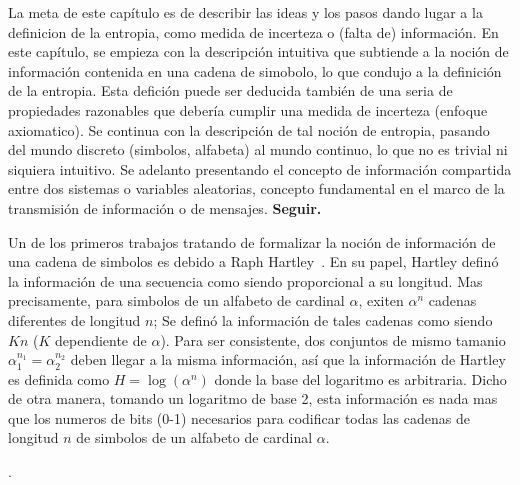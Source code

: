 {\color{red} La  meta de este cap\'itulo es  de describir las ideas  y los pasos
  dando lugar a la definicion de  la entropia, como medida de incerteza o (falta
  de)  informaci\'on.   En este  cap\'itulo,  se  empieza  con la  descripci\'on
  intuitiva que subtiende a la noci\'on de informaci\'on contenida en una cadena
  de simobolo, lo que condujo a  la definici\'on de la entropia. Esta defici\'on
  puede  ser deducida  tambi\'en  de  una seria  de  propiedades razonables  que
  deber\'ia cumplir  una medida de incerteza (enfoque  axiomatico).  Se continua
  con la descripci\'on  de tal noci\'on de entropia,  pasando del mundo discreto
  (simbolos,  alfabeta) al  mundo continuo,  lo que  no es  trivial  ni siquiera
  intuitivo.  Se  adelanto presentando  el concepto de  informaci\'on compartida
  entre dos sistemas o variables aleatorias, concepto fundamental en el marco de
  la transmisi\'on de informaci\'on o de mensajes. \bf Seguir. }


\label{s:SZ:Entropia}


\label{sec:SZ:DefinicionShannon}

Un de los primeros trabajos  tratando de formalizar la noci\'on de informaci\'on
de una cadena  de simbolos es debido a Raph  Hartley~\cite{Har28}.  En su papel,
Hartley defin\'o la informaci\'on de una secuencia como siendo proporcional a su
longitud. Mas precisamente,  para simbolos de un alfabeto  de cardinal $\alpha$,
exiten  $\alpha^n$   cadenas  diferentes  de   longitud  $n$;  Se   defin\'o  la
informaci\'on de tales cadenas como  siendo $K n$ ($K$ dependiente de $\alpha$).
Para  ser  consistente,  dos   conjuntos  de  mismo  tamanio  $\alpha_1^{n_1}  =
\alpha_2^{n_2}$   deben  llegar  a   la  misma   informaci\'on,  as\'i   que  la
informaci\'on de Hartley es definida como $H = \log\left( \alpha^n \right)$ donde
la base del logaritmo es arbitraria.  Dicho de otra manera, tomando un logaritmo
de  base 2,  esta  informaci\'on  es nada  mas  que los  numeros  de bits  (0-1)
necesarios para  codificar todas las cadenas  de longitud $n$ de  simbolos de un
alfabeto de cardinal $\alpha$.

.

